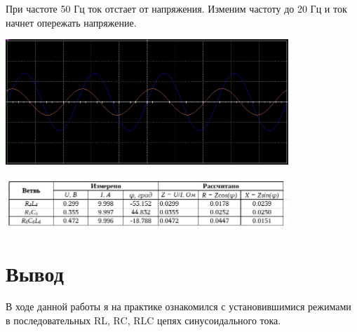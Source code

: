 \documentclass[14pt, a4paper]{article}
\begin{document}
        При частоте 50 Гц ток отстает от напряжения. Изменим частоту до 20 Гц и ток начнет опережать напряжение.

        {
            \includegraphics[width=0.8\textwidth]{RCL_osc20.jpg}
            \centering
        }

        {
            \includegraphics[width=0.8\textwidth]{Table2.jpg}
            \centering
        }
        
    \section*{Вывод}
        В ходе данной работы я на практике ознакомился с установившимися режимами в последовательных RL, RC, RLC цепях синусоидального тока.





        
\end{document}
